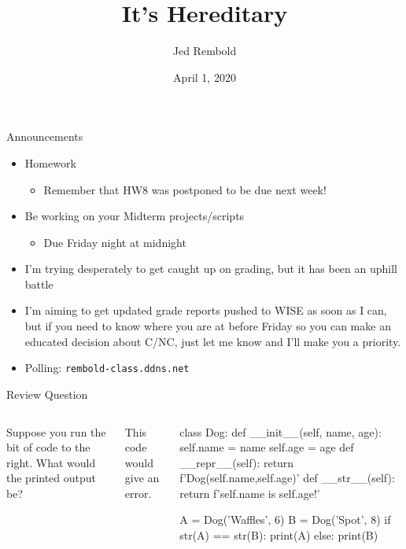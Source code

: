 \documentclass[pdf, aspectratio=169, 12pt]{beamer}
\title{It's Hereditary}
\author{Jed Rembold}
\date{April 1, 2020}
\begin{document}
\begin{frame}{Announcements}
	\begin{itemize}
		\item Homework
			\begin{itemize}
				\item Remember that HW8 was postponed to be due next week!
			\end{itemize}
		\item Be working on your Midterm projects/scripts
			\begin{itemize}
				\item Due Friday night at midnight
			\end{itemize}
		\item I'm trying desperately to get caught up on grading, but it has been an uphill battle
		\item I'm aiming to get updated grade reports pushed to WISE as soon as I can, but if you need to know where you are at before Friday so you can make an educated decision about C/NC, just let me know and I'll make you a priority.
		\item Polling: \nolinkurl{rembold-class.ddns.net}
	\end{itemize}
\end{frame}

\begin{frame}[fragile]{Review Question}
	\begin{columns}
		Suppose you run the bit of code to the right. What would the printed output be?
		\vspace{5mm}
		\begin{poll}
		\item {}
		\item {}
		\item {}
		\item This code would give an error.
		\end{poll}

		\footnotesize
		\begin{pythoncode}
			class Dog:
				def __init__(self, name, age):
					self.name = name
					self.age = age
				def __repr__(self):
					return f'Dog({self.name},{self.age})'
				def __str__(self):
					return f'{self.name} is {self.age}!'

			A = Dog('Waffles', 6)
			B = Dog('Spot', 8)
			if str(A) == str(B):
				print(A)
			else:
				print(B)
		\end{pythoncode}
	\end{columns}
\end{frame}
\end{document}
